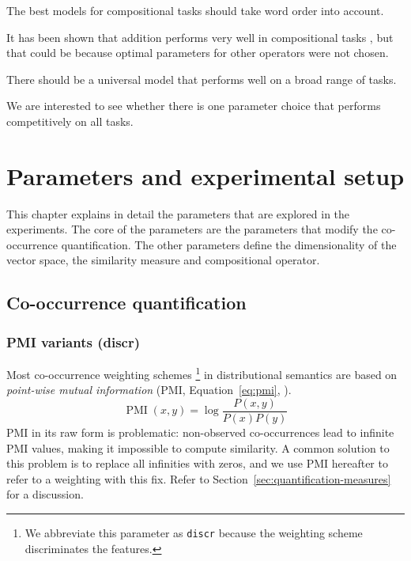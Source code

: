\begin{hyp}
\label{hyp:order}
The best models for compositional tasks should take word order into account.
\end{hyp}

It has been shown that addition performs very well in compositional tasks \cite{milajevs-EtAl:2014:EMNLP2014}, but that could be because optimal parameters for other operators were not chosen.

\begin{hyp}
\label{hyp:universal}
There should be a universal model that performs well on a broad range of tasks.
\end{hyp}

We are interested to see whether there is one parameter choice that performs competitively on all tasks.

\chapter{Parameters and experimental setup}
\label{sec:parameters}

This chapter explains in detail the parameters that are explored in the experiments. The core of the parameters are the parameters that modify the co-occurrence quantification. The other parameters define the dimensionality of the vector space, the similarity measure and compositional operator.
%
%

\section{Co-occurrence quantification}
\label{sec:quantification}

\subsection{PMI variants (discr)}
\label{sec:pmi-variants}

Most co-occurrence weighting schemes%
\footnote{We abbreviate this parameter as \texttt{discr} because the weighting scheme discriminates the features.
}
in distributional semantics are based on \emph{point-wise mutual information} (PMI, Equation~\ref{eq:pmi}, ).
%
\begin{equation}
  \label{eq:pmi}
  \operatorname{PMI}(x, y) = \log\frac{P(x,y)}{P(x)P(y)}
\end{equation}
%
PMI in its raw form is problematic: non-observed co-occurrences lead to infinite PMI values, making it impossible to compute similarity. A common solution to this problem is to replace all infinities with zeros, and we use PMI hereafter to refer to a weighting with this fix. Refer to Section~\ref{sec:quantification-measures} for a discussion.

